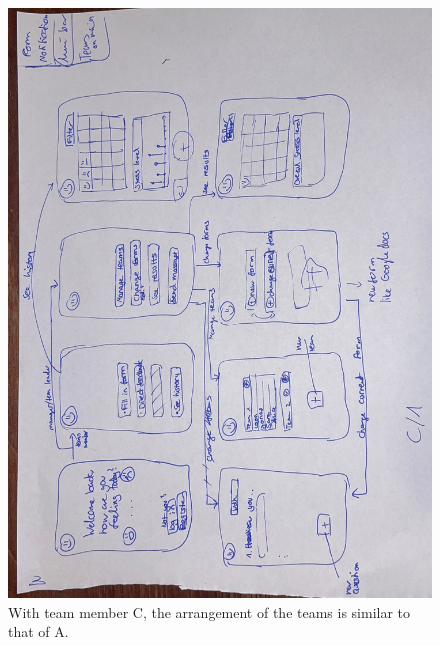 \documentclass[11pt]{article}
\begin{document}
\begin{figure}[!h]
    \centering
    \includegraphics[scale = 0.45,angle=90]{figures/C1.jpg}
    \caption{With team member C, the arrangement of the teams is similar to that of A.}
\end{figure}
\end{document}
